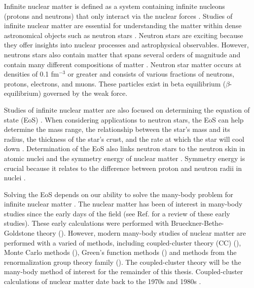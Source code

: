 Infinite nuclear matter is defined as a system containing infinite nucleons (protons and neutrons) that only interact via the nuclear forces \cite{Ref8}. Studies of infinite nuclear matter are essential for understanding the matter within dense astronomical objects such as neutron stars \cite{Ref3}. Neutron stars are exciting because they offer insights into nuclear processes and astrophysical observables. However, neutrons stars also contain matter that spans several orders of magnitude and contain many different compositions of matter \cite{Ref3,Ref35,Ref36,Ref37,Ref38,Ref39,Ref41}. Neutron star matter occurs at densities of 0.1 fm$^{-3}$ or greater and consists of various fractions of neutrons, protons, electrons, and muons. These particles exist in beta equilibrium ($\beta$-equilibrium) governed by the weak force.

Studies of infinite nuclear matter are also focused on determining the equation of state (EoS) . When considering applications to neutron stars, the EoS can help determine the mass range, the relationship between the star's mass and its radius, the thickness of the star's crust, and the rate at which the star will cool down \cite{Ref3}. Determination of the EoS also links neutron stars to the neutron skin in atomic nuclei and the symmetry energy of nuclear matter . Symmetry energy is crucial because it relates to the difference between proton and neutron radii in nuclei \cite{Ref8}.

Solving the EoS depends on our ability to solve the many-body problem for infinite nuclear matter \cite{Ref3,Ref8}. The nuclear matter has been of interest in many-body studies since the early days of the field (see Ref. \cite{Ref51} for a review of these early studies). These early calculations were performed with Brueckner-Bethe-Goldstone theory (\cite{Ref52,Ref53}). However, modern many-body studies of nuclear matter are performed with a varied of methods, including coupled-cluster theory (CC) (\cite{Ref3,Ref4,Ref5,Ref8,Ref9,Ref16,Ref43,Ref47}), Monte Carlo methods (\cite{Ref33,Ref54,Ref55,Ref56,Ref57,Ref58,Ref59,Ref60,Ref61}), Green's function methods (\cite{Ref50,Ref62,Ref63,Ref64}) and methods from the renormalization group theory family (\cite{Ref48,Ref3,Ref65}). The coupled-cluster theory will be the many-body method of interest for the remainder of this thesis. Coupled-cluster calculations of nuclear matter date back to the 1970s and 1980s \cite{Ref8}.

